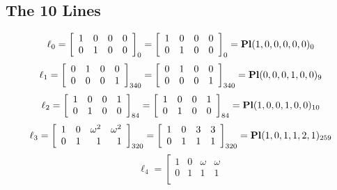 \documentclass{article}
\begin{document}
{\subsection*{The 10 Lines}
$$
\ell_{0} = 
\left[
\begin{array}{*{4}{r}}
1 & 0 & 0 & 0\\
0 & 1 & 0 & 0\\
\end{array}
\right]
_{0}
=
\left[
\begin{array}{*{4}c}
1  & 0  & 0  & 0\\
0  & 1  & 0  & 0\\
\end{array}
\right]_{0}
={\rm\bf Pl}(1,0,0,0,0,0 )_{0}$$
$$
\ell_{1} = 
\left[
\begin{array}{*{4}{r}}
0 & 1 & 0 & 0\\
0 & 0 & 0 & 1\\
\end{array}
\right]
_{340}
=
\left[
\begin{array}{*{4}c}
0  & 1  & 0  & 0\\
0  & 0  & 0  & 1\\
\end{array}
\right]_{340}
={\rm\bf Pl}(0,0,0,1,0,0 )_{9}$$
$$
\ell_{2} = 
\left[
\begin{array}{*{4}{r}}
1 & 0 & 0 & 1\\
0 & 1 & 0 & 0\\
\end{array}
\right]
_{84}
=
\left[
\begin{array}{*{4}c}
1  & 0  & 0  & 1\\
0  & 1  & 0  & 0\\
\end{array}
\right]_{84}
={\rm\bf Pl}(1,0,0,1,0,0 )_{10}$$
$$
\ell_{3} = 
\left[
\begin{array}{*{4}{r}}
1 & 0 & \omega^{2} & \omega^{2}\\
0 & 1 & 1 & 1\\
\end{array}
\right]
_{320}
=
\left[
\begin{array}{*{4}c}
1  & 0  & 3  & 3\\
0  & 1  & 1  & 1\\
\end{array}
\right]_{320}
={\rm\bf Pl}(1,0,1,1,2,1 )_{259}$$
$$
\ell_{4} = 
\left[
\begin{array}{*{4}{r}}
1 & 0 & \omega  & \omega \\
0 & 1 & 1 & 1\\

\end{array}$$}
\end{document}
